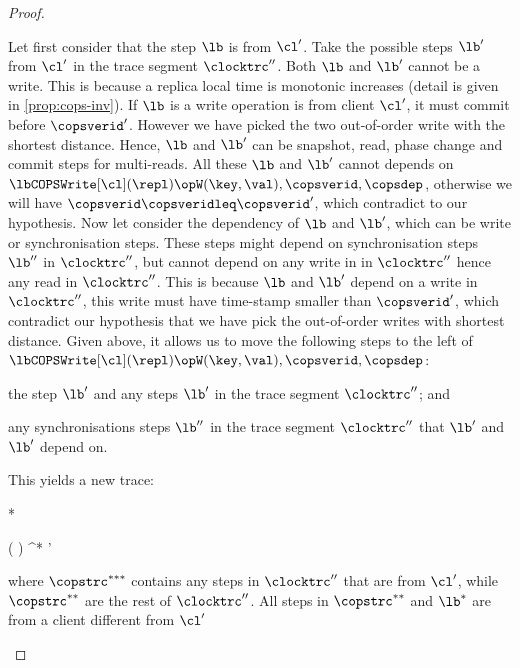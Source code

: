 \begin{proof}
\begin{enumerate}
    Let first consider that the step \( \lb \) is from \( \cl' \).
    Take the possible steps \( \lb' \) from \( \cl' \) in the trace segment \( \clocktrc'' \). 
    Both \( \lb \) and \( \lb' \) cannot be a write. 
    This is because a replica local time is monotonic increases (detail is given in \cref{prop:cops-inv}).
    If \( \lb \) is a write operation is from client \( \cl' \),
    it must commit before \( \copsverid' \).
    However we have picked the two out-of-order write with the shortest distance.
    Hence, \( \lb \) and \( \lb' \) can be snapshot, read, phase change and commit steps for multi-reads.
    All these \( \lb \) and \( \lb' \) cannot depends on \( \lbCOPSWrite[\cl](\repl){\opW(\key,\val), \copsverid, \copsdep }  \),
    otherwise we will have \( \copsverid \copsveridleq \copsverid' \), which contradict to our hypothesis.
    Now let consider the dependency of \( \lb \) and \( \lb' \), which can be write or synchronisation steps.
    These steps might depend on synchronisation steps \( \lb'' \) in \( \clocktrc'' \),
    but cannot depend on any write in in \( \clocktrc'' \) hence any read in \( \clocktrc'' \).
    This is because \( \lb \) and \( \lb' \) depend on a write in \( \clocktrc'' \),
    this write must have time-stamp smaller than \( \copsverid' \),
    which contradict our hypothesis that we have pick the out-of-order writes with shortest distance.
    Given above, it allows us to move the following steps to 
    the left of \( \lbCOPSWrite[\cl](\repl){\opW(\key,\val), \copsverid, \copsdep } \): 
    \begin{enumerate*}
    \item the step \( \lb' \) and any steps \( \lb' \) in the trace segment \( \clocktrc'' \); and 
    \item any synchronisations steps \( \lb'' \)  in the trace segment \( \clocktrc'' \) that  \( \lb' \) and \( \lb' \) depend on.
    \end{enumerate*}
    This yields a new trace:
    \begin{Formulae}*
    \begin{Formula}
    \left(
            \right) \copstrceq \copstrc^* 
        \land \copsverid' \copsveridleq \copsverid 
    \end{Formula}
    \end{Formulae}
    where \( \copstrc^{***} \) contains any steps in \( \clocktrc'' \) that are from \( \cl' \),
    while \( \copstrc^{**} \) are the rest of \( \clocktrc'' \).
    All steps in \( \copstrc^{**} \) and \( \lb^{*} \) are from a client different from \( \cl' \)



\end{enumerate}
\end{proof}
